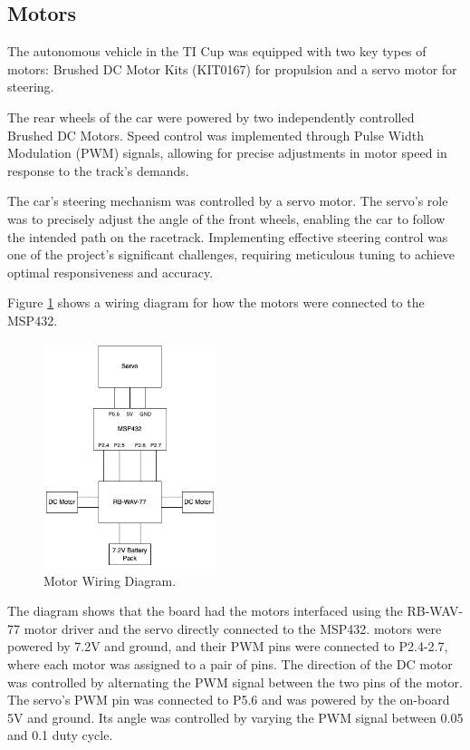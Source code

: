 \documentclass[conference]{IEEEtran}
\begin{document}
\subsection{Motors}

The autonomous vehicle in the TI Cup was equipped with two key types of motors: Brushed DC Motor Kits (KIT0167) for propulsion and a servo motor for steering.

The rear wheels of the car were powered by two independently controlled Brushed DC Motors. Speed control was implemented through Pulse Width Modulation (PWM) signals, allowing for precise adjustments in motor speed in response to the track's demands.

The car's steering mechanism was controlled by a servo motor. The servo's role was to precisely adjust the angle of the front wheels, enabling the car to follow the intended path on the racetrack. Implementing effective steering control was one of the project's significant challenges, requiring meticulous tuning to achieve optimal responsiveness and accuracy.

Figure \ref{fig:motorWiring} shows a wiring diagram for how the motors were connected to the MSP432.

\begin{figure}[htbp]
	\centerline{\includegraphics[width=0.45\textwidth]{images/motorsWiring.png}}
	\caption{Motor Wiring Diagram.}
	\label{fig:motorWiring}
\end{figure}

The diagram shows that the board had the motors interfaced using the RB-WAV-77 motor driver and the servo directly connected to the MSP432. motors were powered by 7.2V and ground, and their PWM pins were connected to P2.4-2.7, where each motor was assigned to a pair of pins. The direction of the DC motor was controlled by alternating the PWM signal between the two pins of the motor. The servo's PWM pin was connected to P5.6 and was powered by the on-board 5V and ground. Its angle was controlled by varying the PWM signal between 0.05 and 0.1 duty cycle.
\end{document}
